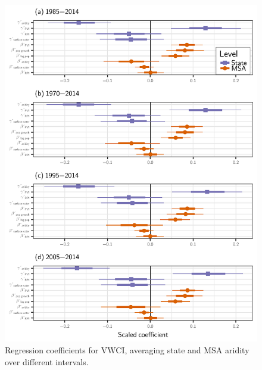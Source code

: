 \documentclass[draft]{agujournal}
\begin{document}
\begin{figure}
\includegraphics[width=6.25in]{figures_si/vwci_years_cat_plots-1} \caption[Regression coefficients for VWCI, averaging state and MSA aridity over different intervals]{Regression coefficients for VWCI, averaging state and MSA aridity over different intervals.}\label{fig:vwci_years_cat_plots}
\end{figure}



\end{document}
